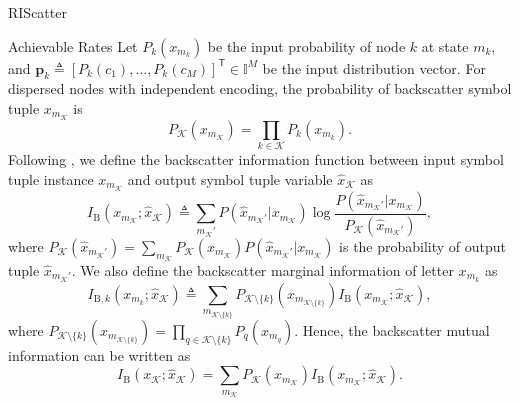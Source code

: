 \documentclass[journal]{IEEEtran}
\begin{document}
\begin{section}{RIScatter}
	\begin{subsection}{Achievable Rates}
		Let $P_k(x_{m_k})$ be the input probability of node $k$ at state $m_k$, and $\boldsymbol{p}_k \triangleq [P_k(c_1),\ldots,P_k(c_M)]^\mathsf{T} \in \mathbb{I}^{M}$ be the input distribution vector.
		For dispersed nodes with independent encoding, the probability of backscatter symbol tuple $x_{m_{\mathcal{K}}}$ is
		\begin{equation}
			P_{\mathcal{K}}(x_{m_{\mathcal{K}}}) = \prod_{k \in \mathcal{K}} P_k(x_{m_k}).
			\label{eq:equivalent_distribution}
		\end{equation}
		Following \cite{Rezaeian2004}, we define the backscatter information function between input symbol tuple instance $x_{m_{\mathcal{K}}}$ and output symbol tuple variable $\hat{x}_{\mathcal{K}}$ as
		\begin{equation}
			I_{\text{B}}(x_{m_{\mathcal{K}}};\hat{x}_{\mathcal{K}}) \triangleq \sum_{m_{\mathcal{K}}'} P(\hat{x}_{m_{\mathcal{K}}'}|x_{m_{\mathcal{K}}}) \log \frac{P(\hat{x}_{m_{\mathcal{K}}'}|x_{m_{\mathcal{K}}})}{P_{\mathcal{K}}(\hat{x}_{m_{\mathcal{K}}'})},
			\label{eq:backscatter_information_function}
		\end{equation}
		where $P_{\mathcal{K}}(\hat{x}_{m_{\mathcal{K}}'}) = \sum_{m_{\mathcal{K}}} P_{\mathcal{K}}(x_{m_{\mathcal{K}}}) P(\hat{x}_{m_{\mathcal{K}}'}|x_{m_{\mathcal{K}}})$ is the probability of output tuple $\hat{x}_{m_{\mathcal{K}}'}$.
		We also define the backscatter marginal information of letter $x_{m_k}$ as
		\begin{equation}
			I_{\text{B},k}(x_{m_k};\hat{x}_{\mathcal{K}}) \triangleq \sum_{m_{\mathcal{K} \setminus \{k\}}} P_{\mathcal{K} \setminus \{k\}}(x_{m_{\mathcal{K} \setminus \{k\}}}) I_{\text{B}}(x_{m_{\mathcal{K}}};\hat{x}_{\mathcal{K}}),
			\label{eq:backscatter_marginal_information}
		\end{equation}
		where $P_{\mathcal{K} \setminus \{k\}}(x_{m_{\mathcal{K} \setminus \{k\}}}) = \prod_{q \in \mathcal{K} \setminus \{k\}} P_{q}(x_{m_{q}})$.
		Hence, the backscatter mutual information can be written as
		\begin{equation}
			I_{\text{B}}(x_{\mathcal{K}};\hat{x}_{\mathcal{K}}) = \sum_{m_{\mathcal{K}}} P_{\mathcal{K}}(x_{m_{\mathcal{K}}}) I_{\text{B}}(x_{m_{\mathcal{K}}};\hat{x}_{\mathcal{K}}).
			\label{eq:backscatter_mutual_information}
		\end{equation}


\end{subsection}
\end{section}
\end{document}
